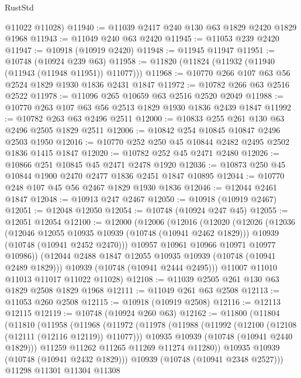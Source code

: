 \begin{lexlean}{RustStd}
\begin{coremodule}
{\begin{coremodule}
{{{{{      @11022
      @11028)
@11940 := @11039 @2417 @240 @130 @63 @1829 @2420 @1829 @1968
@11943 := @11049 @240 @63 @2420
@11945 := @11053 @239 @2420
@11947 := @10918 (@10919 @2420)
@11948 := @11945 @11947
@11951 := @10748 (@10924 @239 @63)
@11958 := @11820 (@11824 (@11932 (@11940 (@11943 (@11948 @11951)) @11077)))
@11968 := @10770 @266 @107 @63 @56 @2524 @1829 @1930 @1836 @2431 @1847
@11972 := @10782 @266 @63 @2516 @2522
@11978 := @11096 @265 @10659 @63 @2516 @2520 @2049
@11988 := @10770 @263 @107 @63 @56 @2513 @1829 @1930 @1836 @2439 @1847
@11992 := @10782 @263 @63 @2496 @2511
@12000 := @10833 @255 @261 @130 @63 @2496 @2505 @1829 @2511
@12006 := @10842 @254 @10845 @10847 @2496 @2503 @1950
@12016 := @10770 @252 @250 @45 @10844 @2482 @2495 @2502 @1836 @1415 @1847
@12020 := @10782 @252 @45 @2471 @2480
@12026 := @10866 @251 @10845 @45 @2471 @2478 @1920
@12036 := @10873 @250 @45 @10844 @1900 @2470 @2477 @1836 @2451 @1847 @10895
@12044 := @10770 @248 @107 @45 @56 @2467 @1829 @1930 @1836
@12046 := @12044 @2461 @1847
@12048 := @10913 @247 @2467
@12050 := @10918 (@10919 @2467)
@12051 := @12048 @12050
@12054 := @10748 (@10924 @247 @45)
@12055 := @12051 @12054
@12100 := @12000
    (@12006
      (@12016
        (@12020
          (@12026
            (@12036
              (@12046 @12055 @10935 @10939 (@10748 (@10941 @2462 @1829)))
              @10939
              (@10748 (@10941 @2452 @2470)))
            @10957
            @10961
            @10966
            @10971
            @10977
            @10986))
        (@12044 @2488 @1847 @12055 @10935 @10939 (@10748 (@10941 @2489 @1829)))
        @10939
        (@10748 (@10941 @2444 @2495)))
      @11007
      @11010
      @11013
      @11017
      @11022
      @11028)
@12108 := @11039 @2505 @261 @130 @63 @1829 @2508 @1829 @1968
@12111 := @11049 @261 @63 @2508
@12113 := @11053 @260 @2508
@12115 := @10918 (@10919 @2508)
@12116 := @12113 @12115
@12119 := @10748 (@10924 @260 @63)
@12162 := @11800
    (@11804
      (@11810
        (@11958
          (@11968
            (@11972
              (@11978
                (@11988
                  (@11992 (@12100 (@12108 (@12111 (@12116 @12119)) @11077)))
                  @10935
                  @10939
                  (@10748 (@10941 @2440 @1829)))
                @11259
                @11262
                @11265
                @11269
                @11274
                @11280))
            @10935
            @10939
            (@10748 (@10941 @2432 @1829)))
          @10939
          (@10748 (@10941 @2348 @2527)))
        @11298
        @11301
        @11304
        @11308
}}}}}
\end{coremodule}}
\end{coremodule}
\end{lexlean}

